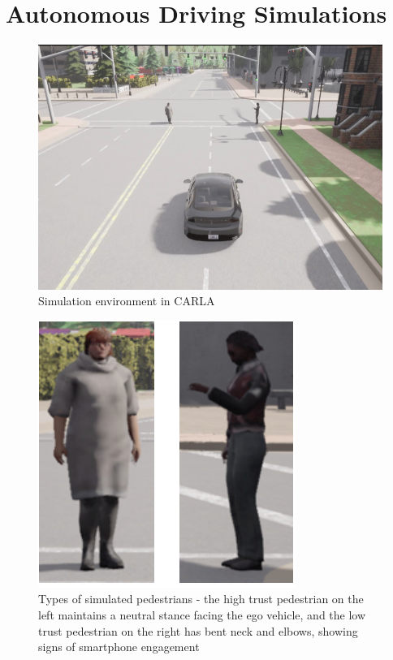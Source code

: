 \documentclass[journal]{IEEEtran}
\begin{document}
\section{Autonomous Driving Simulations}
\label{section-simulation}
\begin{figure}
  \centering
  \includegraphics[width = 0.8\columnwidth]{carla_sim.png}
  \caption{Simulation environment in CARLA}
  \label{carla_sim}
\end{figure}

\begin{figure}
  \centering
  \includegraphics[width = 0.5\columnwidth]{actors}
  \caption{Types of simulated pedestrians - the high trust pedestrian on the left maintains a neutral stance facing the ego vehicle, and the low trust pedestrian on the right has bent neck and elbows, showing signs of smartphone engagement}
  \label{ped_type}
\end{figure}
\end{document}
